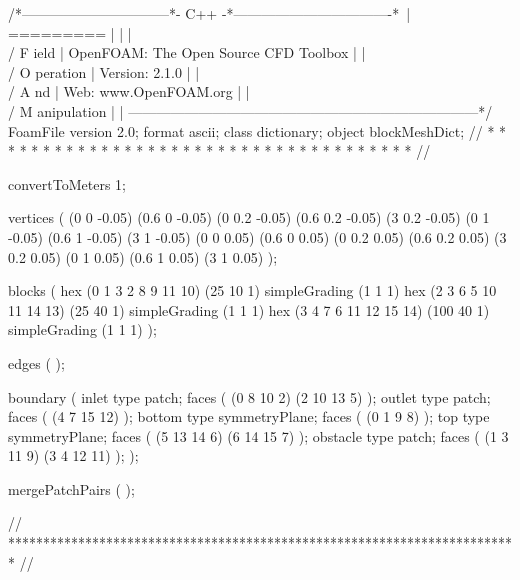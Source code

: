 \begin{OFverbatim}
/*--------------------------------*- C++ -*----------------------------------*\
| =========                 |                                                 |
| \\      /  F ield         | OpenFOAM: The Open Source CFD Toolbox           |
|  \\    /   O peration     | Version:  2.1.0                                 |
|   \\  /    A nd           | Web:      www.OpenFOAM.org                      |
|    \\/     M anipulation  |                                                 |
\*---------------------------------------------------------------------------*/
FoamFile
{
    version     2.0;
    format      ascii;
    class       dictionary;
    object      blockMeshDict;
}
// * * * * * * * * * * * * * * * * * * * * * * * * * * * * * * * * * * * * * //

convertToMeters 1;

vertices        
(
    (0 0 -0.05)
    (0.6 0 -0.05)
    (0 0.2 -0.05)
    (0.6 0.2 -0.05)
    (3 0.2 -0.05)
    (0 1 -0.05)
    (0.6 1 -0.05)
    (3 1 -0.05)
    (0 0 0.05)
    (0.6 0 0.05)
    (0 0.2 0.05)
    (0.6 0.2 0.05)
    (3 0.2 0.05)
    (0 1 0.05)
    (0.6 1 0.05)
    (3 1 0.05)
);

blocks          
(
    hex (0 1 3 2 8 9 11 10) (25 10 1) simpleGrading (1 1 1)
    hex (2 3 6 5 10 11 14 13) (25 40 1) simpleGrading (1 1 1)
    hex (3 4 7 6 11 12 15 14) (100 40 1) simpleGrading (1 1 1)
);

edges           
(
);

boundary
(
    inlet
    {
        type patch;
        faces
        (
            (0 8 10 2)
            (2 10 13 5)
        );
    }
    outlet
    {
        type patch;
        faces
        (
            (4 7 15 12)
        );
    }
    bottom
    {
        type symmetryPlane;
        faces
        (
            (0 1 9 8)
        );
    }
    top
    {
        type symmetryPlane;
        faces
        (
            (5 13 14 6)
            (6 14 15 7)
        );
    }
    obstacle
    {
        type patch;
        faces
        (
            (1 3 11 9)
            (3 4 12 11)
        );
    }
);

mergePatchPairs
(
);

// ************************************************************************* //
\end{OFverbatim}


